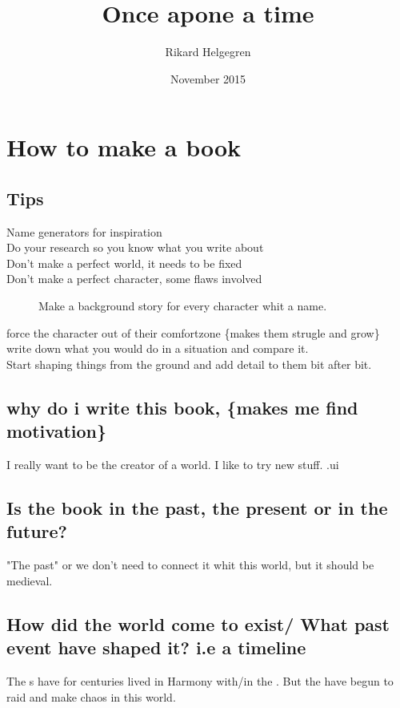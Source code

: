 \documentclass{article}
\title{Once apone a time}
\author{Rikard Helgegren}
\date{November 2015}
\begin{document}
\maketitle
\tableofcontents 
\newpage
\section{How to make a book}

\subsection{Tips}
\begin{description}
\item[Name generators for inspiration]
\item[Do your research so you know what you write about]
\item[Don't make a perfect world, it needs to be fixed]
\item[Don't make a perfect character, some flaws involved] Make a background story for every character whit a name.
\item[force the character out of their comfortzone \{makes them strugle and grow\} ]
\item[write down what you would do in a situation and compare it.]
\item[Start shaping things from the ground and add detail to them bit after bit.]
\end{description}
\subsection{why do i write this book, \{makes me find motivation\}}
I really want to be the creator of a world.
I like to try new stuff. .ui


\subsection{Is the book in the past, the present or in the future?} "The past" or we don't need to connect it whit this world, but it should be medieval.

\subsection{How did the world come to exist/ What past event have shaped it? i.e a timeline} The s have for centuries lived in Harmony with/in the . But the  have begun to raid and make chaos in this world.
\end{document}
